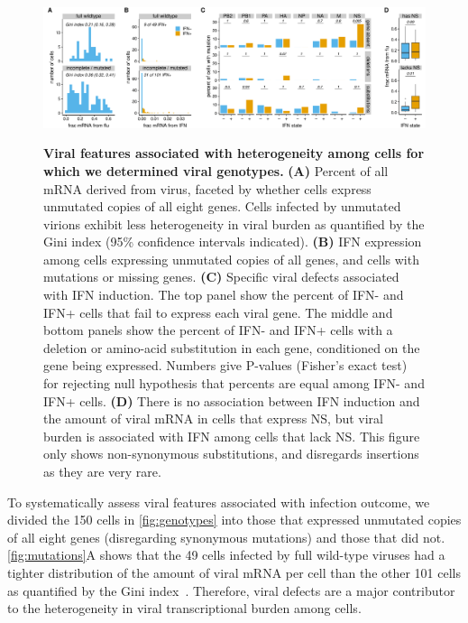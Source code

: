 \documentclass[10pt,letterpaper]{article}
\newenvironment{fullwidth}{%
  \begin{adjustwidth}{-2.05in}{}
}{\end{adjustwidth}}
\newcommand{\FIG}[1]{\autoref{fig:#1}}
\begin{document}
\begin{figure}
\begin{fullwidth}
{\centering
\includegraphics[width=\linewidth]{figures/single_cell_figures/p_mutations.pdf}
}
\caption{
{\bf Viral features associated with heterogeneity among cells for which we determined viral genotypes.}
{\bf (A)} 
Percent of all mRNA derived from virus, faceted by whether cells express unmutated copies of all eight genes.
Cells infected by unmutated virions exhibit less heterogeneity in viral burden as quantified by the Gini index (95\% confidence intervals indicated).
{\bf (B)}
IFN expression among cells expressing unmutated copies of all genes, and cells with mutations or missing genes.
{\bf (C)}
Specific viral defects associated with IFN induction.
The top panel show the percent of IFN- and IFN+ cells that fail to express each viral gene.
The middle and bottom panels show the percent of IFN- and IFN+ cells with a deletion or amino-acid substitution in each gene, conditioned on the gene being expressed.
Numbers give P-values (Fisher's exact test) for rejecting null hypothesis that percents are equal among IFN- and IFN+ cells. 
{\bf (D)}
There is no association between IFN induction and the amount of viral mRNA in cells that express NS, but viral burden is associated with IFN among cells that lack NS.
This figure only shows non-synonymous substitutions, and disregards insertions as they are very rare.
}
\label{fig:mutations}

\end{fullwidth}
\end{figure}

To systematically assess viral features associated with infection outcome, we divided the 150 cells in \FIG{genotypes} into those that expressed unmutated copies of all eight genes (disregarding synonymous mutations) and those that did not.
\FIG{mutations}A shows that the 49 cells infected by full wild-type viruses had a tighter distribution of the amount of viral mRNA per cell than the other 101 cells as quantified by the Gini index~\citep{gini1921measurement}.
Therefore, viral defects are a major contributor to the heterogeneity in viral transcriptional burden among cells.
\end{document}

